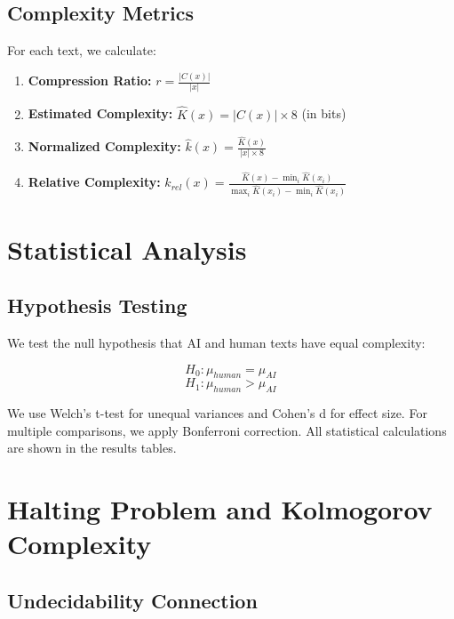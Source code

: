 \documentclass[12pt,a4paper]{report}
\begin{document}
\subsection{Complexity Metrics}

For each text, we calculate:

\begin{enumerate}
    \item \textbf{Compression Ratio:} $r = \frac{|C(x)|}{|x|}$
    \item \textbf{Estimated Complexity:} $\hat{K}(x) = |C(x)| \times 8$ (in bits)
    \item \textbf{Normalized Complexity:} $\hat{k}(x) = \frac{\hat{K}(x)}{|x| \times 8}$
    \item \textbf{Relative Complexity:} $k_{rel}(x) = \frac{\hat{K}(x) - \min_i\hat{K}(x_i)}{\max_i\hat{K}(x_i) - \min_i\hat{K}(x_i)}$
\end{enumerate}

\section{Statistical Analysis}

\subsection{Hypothesis Testing}

We test the null hypothesis that AI and human texts have equal complexity:

\begin{equation}
H_0: \mu_{human} = \mu_{AI}
\end{equation}
\begin{equation}
H_1: \mu_{human} > \mu_{AI}
\end{equation}

We use Welch's t-test for unequal variances and Cohen's d for effect size. For multiple comparisons, we apply Bonferroni correction. All statistical calculations are shown in the results tables.

\section{Halting Problem and Kolmogorov Complexity}

\subsection{Undecidability Connection}
\end{document}
